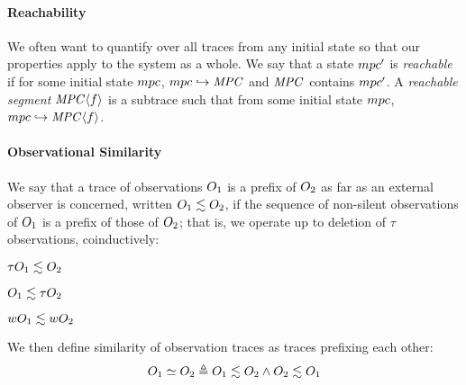 \documentclass[acmsmall,review,anonymous]{acmart}\settopmatter{printfolios=true,printccs=false,printacmref=false}
\begin{document}
\paragraph*{Reachability}

We often want to quantify over all traces from any initial state so that our
properties apply to the system as a whole. We say that a state \(mpc'\)
is {\em reachable} if for some initial state \(mpc\), \(mpc \hookrightarrow \mathit{MPC}\)
and \(\mathit{MPC}\) contains \(mpc'\). A {\it reachable segment} \(\mathit{MPC} \langle f \rangle\) is a subtrace
such that from some initial state \(mpc\), \(mpc \hookrightarrow \mathit{MPC} \langle f \rangle\).

\paragraph*{Observational Similarity}

We say that a trace of observations $O_1$ is a prefix of $O_2$
as far as an external observer is concerned, written \(O_1 \lesssim
O_2\), if the sequence of
non-silent observations of $O_1$ is a prefix of those of
$O_2$; that is, we operate up to deletion of \(\tau\) observations,
coinductively:

\begin{minipage}{.3\textwidth}
  \judgment{}{\(\obsT \lesssim \obsT\)}
\end{minipage}
\begin{minipage}{.3\textwidth}
\judgment{}{\(\tau \lesssim \obsT\)}
\end{minipage}
\begin{minipage}{.3\textwidth}
\end{minipage}

\begin{minipage}{.3\textwidth}
         {\(\tau O_1 \lesssim O_2\)}
\end{minipage}
\begin{minipage}{.3\textwidth}
         {\(O_1 \lesssim \tau O_2\)}
\end{minipage}
\begin{minipage}{.3\textwidth}
         {\(wO_1 \lesssim wO_2\)}
\end{minipage}

\smallskip
We then define similarity of observation traces as traces prefixing each other:
\[O_1 \simeq O_2 \triangleq O_1 \lesssim O_2 \land O_2 \lesssim O_1\]
%
\end{document}
